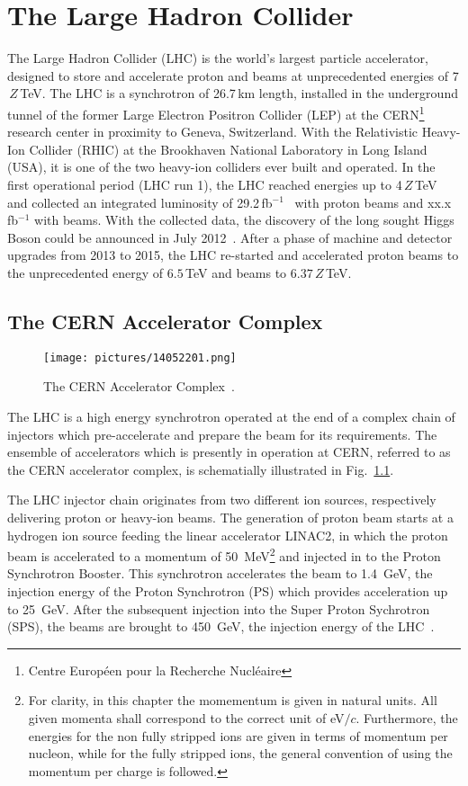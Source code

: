 \chapter{The Large Hadron Collider}\label{thelhc}
%
%
The Large Hadron Collider (LHC) is the world's largest particle accelerator, designed to store and accelerate proton and \lead beams at unprecedented energies of 7$\,Z\,$TeV. The LHC is a synchrotron of 26.7\,km length, installed in the underground tunnel of the former Large Electron Positron Collider (LEP) at the CERN\footnote{Centre Europ\'{e}en pour la Recherche Nucl\'{e}aire} research center in proximity to Geneva, Switzerland. With the Relativistic Heavy-Ion Collider (RHIC) at the Brookhaven National Laboratory in Long Island (USA), it is one of the two heavy-ion colliders ever built and operated\cite{Fischer2014}. In the first operational period (LHC run 1), the LHC reached energies up to 4$\,Z\,$TeV and collected an integrated luminosity of 29.2\,fb$^{-1}$~\cite{lamont_moyab101} with proton beams and xx.x\,fb$^{-1}$ with \lead beams. With the collected data, the discovery of the long sought Higgs Boson could be announced in July 2012~\cite{}. After a phase of machine and detector upgrades from 2013 to 2015, the LHC re-started and accelerated proton beams to the unprecedented energy of $6.5\,$TeV and \lead beams to $6.37\,Z\,$TeV.
%
%
\section{The CERN Accelerator Complex}
%
  \begin{figure}[t]
    \centering
    \texttt{[image: pictures/14052201.png]}
    \caption{ The CERN Accelerator Complex~\cite{Christiane:1260465}.}  
    \label{pic:14052201}
  \end{figure}
%
The LHC is a high energy synchrotron operated at the end of a complex chain of injectors which pre-accelerate and prepare the beam for its requirements. The ensemble of accelerators which is presently in operation at CERN, referred to as the CERN accelerator complex, is schematially illustrated in Fig.~\ref{pic:14052201}. 

The LHC injector chain originates from two different ion sources, respectively delivering proton or heavy-ion beams. The generation of proton beam starts at a hydrogen ion source feeding the linear accelerator LINAC2, in which the proton beam is accelerated to a momentum of 50~MeV\footnote{For clarity, in this chapter the momementum is given in natural units. All given momenta shall correspond to the correct unit of eV$/c$. Furthermore, the energies for the non fully stripped ions are given in terms of momentum per nucleon, while for the fully stripped ions, the general convention of using the momentum per charge is followed.} and injected in to the Proton Synchrotron Booster. This synchrotron accelerates the beam to 1.4~GeV, the injection energy of the Proton Synchrotron (PS) which provides acceleration up to 25~GeV. After the subsequent injection into the Super Proton Sychrotron (SPS), the beams are brought to 450~GeV, the injection energy of the LHC~\citedr. 
%

